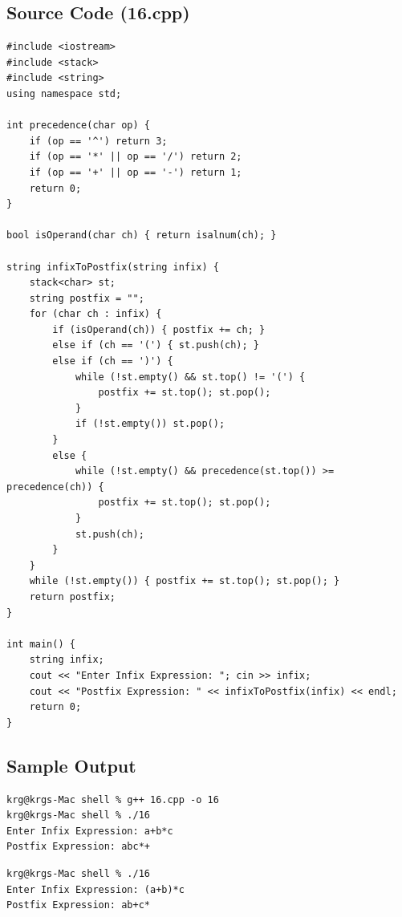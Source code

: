 \documentclass[a4paper,12pt]{article}
\begin{document}
\subsection*{Source Code (16.cpp)}
\begin{lstlisting}[style=cppstyle]
#include <iostream>
#include <stack>
#include <string>
using namespace std;

int precedence(char op) {
    if (op == '^') return 3;
    if (op == '*' || op == '/') return 2;
    if (op == '+' || op == '-') return 1;
    return 0;
}

bool isOperand(char ch) { return isalnum(ch); }

string infixToPostfix(string infix) {
    stack<char> st;
    string postfix = "";
    for (char ch : infix) {
        if (isOperand(ch)) { postfix += ch; }
        else if (ch == '(') { st.push(ch); }
        else if (ch == ')') {
            while (!st.empty() && st.top() != '(') {
                postfix += st.top(); st.pop();
            }
            if (!st.empty()) st.pop();
        }
        else {
            while (!st.empty() && precedence(st.top()) >= precedence(ch)) {
                postfix += st.top(); st.pop();
            }
            st.push(ch);
        }
    }
    while (!st.empty()) { postfix += st.top(); st.pop(); }
    return postfix;
}

int main() {
    string infix;
    cout << "Enter Infix Expression: "; cin >> infix;
    cout << "Postfix Expression: " << infixToPostfix(infix) << endl;
    return 0;
}
\end{lstlisting}

\subsection*{Sample Output}
\begin{lstlisting}[style=outputstyle]
krg@krgs-Mac shell % g++ 16.cpp -o 16
krg@krgs-Mac shell % ./16
Enter Infix Expression: a+b*c
Postfix Expression: abc*+
\end{lstlisting}

\begin{lstlisting}[style=outputstyle]
krg@krgs-Mac shell % ./16
Enter Infix Expression: (a+b)*c
Postfix Expression: ab+c*
\end{lstlisting}

\newpage

\end{document}
